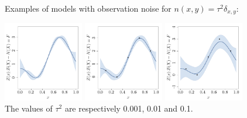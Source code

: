 \begin{frame}{}
Examples of models with observation noise for $n(x,y)=\tau^2 \delta_{x,y}$:
\begin{center}
\includegraphics[height=3.5cm]{1_stat_models/figures/R/ch34_GPRnoise0001}
\includegraphics[height=3.5cm]{1_stat_models/figures/R/ch34_GPRnoise001}
\includegraphics[height=3.5cm]{1_stat_models/figures/R/ch34_GPRnoise01}\\
The values of $\tau^2$ are respectively 0.001, 0.01 and 0.1.
\end{center}
\end{frame}


